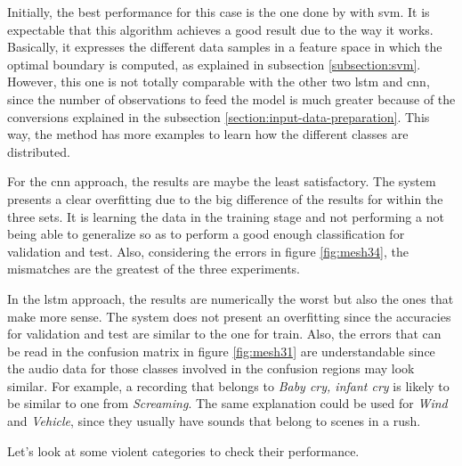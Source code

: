 	Initially, the best performance for this case is the one done by with \acrshort{svm}. It is expectable that this algorithm achieves a good result due to the way it works. Basically, it expresses the different data samples in a feature space in which the optimal boundary is computed, as explained in subsection \ref{subsection:svm}. However, this one is not totally comparable with the other two \acrshort{lstm} and \acrshort{cnn}, since the number of observations to feed the model is much greater because of the conversions explained in the subsection \ref{section:input-data-preparation}. This way, the method has more examples to learn how the different classes are distributed.
	
	For the \acrshort{cnn} approach, the results are maybe the least satisfactory. The system presents a clear overfitting due to the big difference of the results for within the three sets. It is learning the data in the training stage and not performing a not being able to generalize so as to perform a good enough classification for validation and test. Also, considering the errors in figure \ref{fig:mesh34}, the mismatches are the greatest of the three experiments.
	
	In the \acrshort{lstm} approach, the results are numerically the worst but also the ones that make more sense. The system does not present an overfitting since the accuracies for validation and test are similar to the one for train. Also, the errors that can be read in the confusion matrix in figure \ref{fig:mesh31} are understandable since the audio data for those classes involved in the confusion regions may look similar. For example, a recording that belongs to \textit{Baby cry, infant cry} is likely to be similar to one from \textit{Screaming}. The same explanation could be used for \textit{Wind} and \textit{Vehicle}, since they usually have sounds that belong to scenes in a rush.
	
	Let's look at some violent categories to check their performance. 
	
